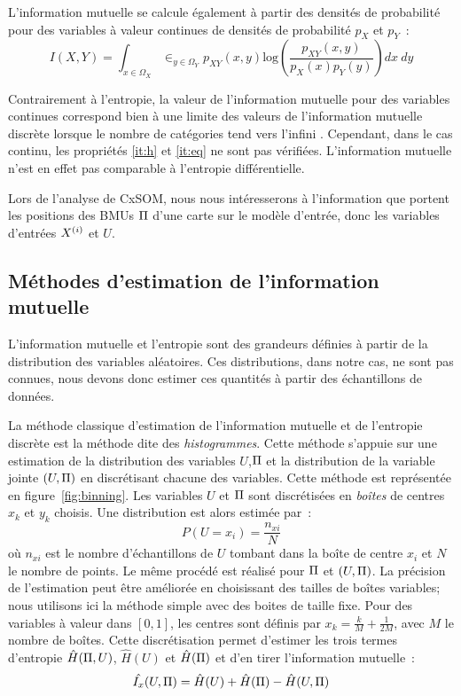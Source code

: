 \documentclass[../main]{subfiles}
\begin{document}
L'information mutuelle se calcule également à partir des densités de probabilité pour des variables à valeur continues de densités de probabilité $p_X$ et $p_Y$~:
\begin{equation}
    I(X,Y) = \int_{x \in \Omega_X}\in _ {y \in \Omega_Y }{p_{XY}(x,y)\textrm{log}(\frac{p_{XY}(x,y)}{p_X(x)p_Y(y)})dx \: dy}
\end{equation}

Contrairement à l'entropie, la valeur de l'information mutuelle pour des variables continues correspond bien à une limite des valeurs de l'information mutuelle discrète lorsque le nombre de catégories tend vers l'infini \cite{Cover2005ElementsOI}.
Cependant, dans le cas continu, les propriétés \ref{it:h} et \ref{it:eq} ne sont pas vérifiées. L'information mutuelle n'est en effet pas comparable à l'entropie différentielle.

Lors de l'analyse de CxSOM, nous nous intéresserons à l'information que portent les positions des BMUs $\Pi$ d'une carte sur le modèle d'entrée, donc les variables d'entrées $X^{({i})}$ et $U$.

\subsection{Méthodes d'estimation de l'information mutuelle}

L'information mutuelle et l'entropie sont des grandeurs définies à partir de la distribution des variables aléatoires. Ces distributions, dans notre cas, ne sont pas connues, nous devons donc estimer ces quantités à partir des échantillons de données.

La méthode classique d'estimation de l'information mutuelle et de l'entropie discrète est la méthode dite des \emph{histogrammes}.
Cette méthode s'appuie sur une estimation de la distribution des variables $U$,$\Pi$ et la distribution de la variable jointe $(U,\Pi)$ en discrétisant chacune des variables.
Cette méthode est représentée en figure~\ref{fig:binning}. Les variables $U$ et $\Pi$ sont discrétisées en \emph{boîtes} de centres $x_k$ et $y_k$ choisis.
Une distribution est alors estimée par~: 
$$P(U = x_i) = \frac{n_{xi}}{N} $$ où $n_{xi}$ est le nombre d'échantillons de $U$ tombant dans la boîte de centre $x_i$ et $N$ le nombre de points. Le même procédé est réalisé pour $\Pi$ et $(U,\Pi)$. La précision de l'estimation peut être améliorée en choisissant des tailles de boîtes variables; nous utilisons ici la méthode simple avec des boites de taille fixe.
Pour des variables à valeur dans $[0,1]$, les centres sont définis par $x_k = \frac{k}{M}+\frac{1}{2M}$, avec $M$ le nombre de boîtes.
Cette discrétisation permet d'estimer les trois termes d'entropie $\hat{H}(\Pi,U)$, $\hat{H}(U)$ et $\hat{H}(\Pi)$ et d'en tirer l'information mutuelle~:
\begin{equation}
    \hat{I_x}(U,\Pi) = \hat{H}(U) + \hat{H}(\Pi) - \hat{H}(U,\Pi)
   \end{equation}
\end{document}

